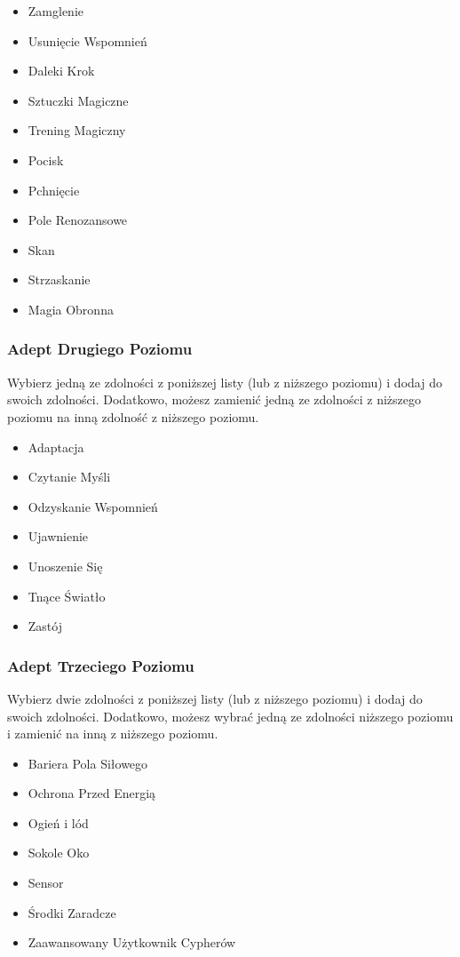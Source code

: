 \begin{itemize}
\item Zamglenie
\item Usunięcie Wspomnień
\item Daleki Krok
\item Sztuczki Magiczne
\item Trening Magiczny
\item Pocisk
\item Pchnięcie
\item Pole Renozansowe
\item Skan
\item Strzaskanie
\item Magia Obronna
\end{itemize}

\subsubsection{Adept Drugiego Poziomu}

Wybierz jedną ze zdolności z poniższej listy (lub z niższego poziomu) i dodaj do swoich zdolności. Dodatkowo, możesz zamienić jedną ze zdolności z niższego poziomu na inną zdolność z niższego poziomu.

\begin{itemize}
\item Adaptacja
\item Czytanie Myśli
\item Odzyskanie Wspomnień
\item Ujawnienie
\item Unoszenie Się
\item Tnące Światło
\item Zastój
\end{itemize}

\subsubsection{Adept Trzeciego Poziomu}

Wybierz dwie zdolności z poniższej listy (lub z niższego poziomu) i dodaj do swoich zdolności. Dodatkowo, możesz wybrać jedną ze zdolności niższego poziomu i zamienić na inną z niższego poziomu. 

\begin{itemize}
\item Bariera Pola Siłowego
\item Ochrona Przed Energią
\item Ogień i lód
\item Sokole Oko
\item Sensor
\item Środki Zaradcze
\item Zaawansowany Użytkownik Cypherów
\end{itemize}

